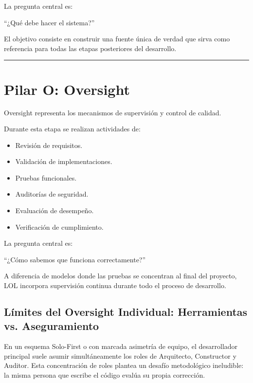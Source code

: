 \documentclass[14pt,a4paper,oneside]{extbook}
\begin{document}
La pregunta central es:

\begin{keyquestion}
\enquote{¿Qué debe hacer el sistema?}
\end{keyquestion}

El objetivo consiste en construir una fuente única de verdad que sirva como referencia para todas las etapas posteriores del desarrollo.

\par\vspace{1.5em}\noindent\hfill\rule{0.25\textwidth}{0.6pt}\hfill\par\vspace{1.5em}

\section{Pilar O: Oversight}

Oversight representa los mecanismos de supervisión y control de calidad.

Durante esta etapa se realizan actividades de:

\begin{itemize}
\item Revisión de requisitos.
\item Validación de implementaciones.
\item Pruebas funcionales.
\item Auditorías de seguridad.
\item Evaluación de desempeño.
\item Verificación de cumplimiento.
\end{itemize}

La pregunta central es:

\begin{keyquestion}
\enquote{¿Cómo sabemos que funciona correctamente?}
\end{keyquestion}

A diferencia de modelos donde las pruebas se concentran al final del proyecto, LOL incorpora supervisión continua durante todo el proceso de desarrollo.

\subsection{Límites del Oversight Individual: Herramientas vs. Aseguramiento}

En un esquema Solo-First o con marcada asimetría de equipo, el desarrollador principal suele asumir simultáneamente los roles de Arquitecto, Constructor y Auditor. Esta concentración de roles plantea un desafío metodológico ineludible: la misma persona que escribe el código evalúa su propia corrección.
\end{document}
